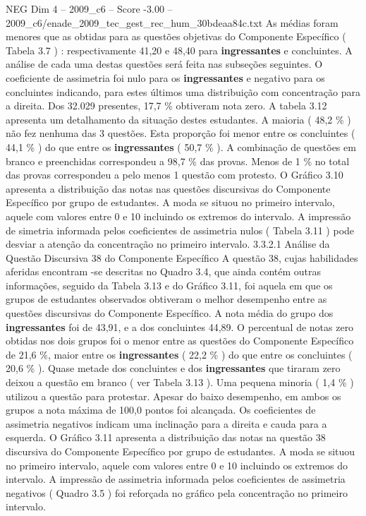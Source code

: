 \begin{textsample}{NEG Dim 4 – 2009\_c6 – Score -3.00 – 2009\_c6/enade\_2009\_tec\_gest\_rec\_hum\_30bdeaa84c.txt}
As médias foram menores que as obtidas para as questões objetivas do Componente Específico ( Tabela 3.7 ) : respectivamente 41,20 e 48,40 para \textbf{ingressantes} e concluintes.
A análise de cada uma destas questões será feita nas subseções seguintes.
O coeficiente de assimetria foi nulo para os \textbf{ingressantes} e negativo para os concluintes indicando, para estes últimos uma distribuição com concentração para a direita.
Dos 32.029 presentes, 17,7 \% obtiveram nota zero.
A tabela 3.12 apresenta um detalhamento da situação destes estudantes.
A maioria ( 48,2 \% ) não fez nenhuma das 3 questões.
Esta proporção foi menor entre os concluintes ( 44,1 \% ) do que entre os \textbf{ingressantes} ( 50,7 \% ).
A combinação de questões em branco e preenchidas correspondeu a 98,7 \% das provas.
Menos de 1 \% no total das provas correspondeu a pelo menos 1 questão com protesto.
O Gráfico 3.10 apresenta a distribuição das notas nas questões discursivas do Componente Específico por grupo de estudantes.
A moda se situou no primeiro intervalo, aquele com valores entre 0 e 10 incluindo os extremos do intervalo.
A impressão de simetria informada pelos coeficientes de assimetria nulos ( Tabela 3.11 ) pode desviar a atenção da concentração no primeiro intervalo. 3.3.2.1 Análise da Questão Discursiva 38 do Componente Específico A questão 38, cujas habilidades aferidas encontram -se descritas no Quadro 3.4, que ainda contém outras informações, seguido da Tabela 3.13 e do Gráfico 3.11, foi aquela em que os grupos de estudantes observados obtiveram o melhor desempenho entre as questões discursivas do Componente Específico.
A nota média do grupo dos \textbf{ingressantes} foi de 43,91, e a dos concluintes 44,89.
O percentual de notas zero obtidas nos dois grupos foi o menor entre as questões do Componente Específico de 21,6 \%, maior entre os \textbf{ingressantes} ( 22,2 \% ) do que entre os concluintes ( 20,6 \% ).
Quase metade dos concluintes e dos \textbf{ingressantes} que tiraram zero deixou a questão em branco ( ver Tabela 3.13 ).
Uma pequena minoria ( 1,4 \% ) utilizou a questão para protestar.
Apesar do baixo desempenho, em ambos os grupos a nota máxima de 100,0 pontos foi alcançada.
Os coeficientes de assimetria negativos indicam uma inclinação para a direita e cauda para a esquerda.
O Gráfico 3.11 apresenta a distribuição das notas na questão 38 discursiva do Componente Específico por grupo de estudantes.
A moda se situou no primeiro intervalo, aquele com valores entre 0 e 10 incluindo os extremos do intervalo.
A impressão de assimetria informada pelos coeficientes de assimetria negativos ( Quadro 3.5 ) foi reforçada no gráfico pela concentração no primeiro intervalo.

\end{textsample}
